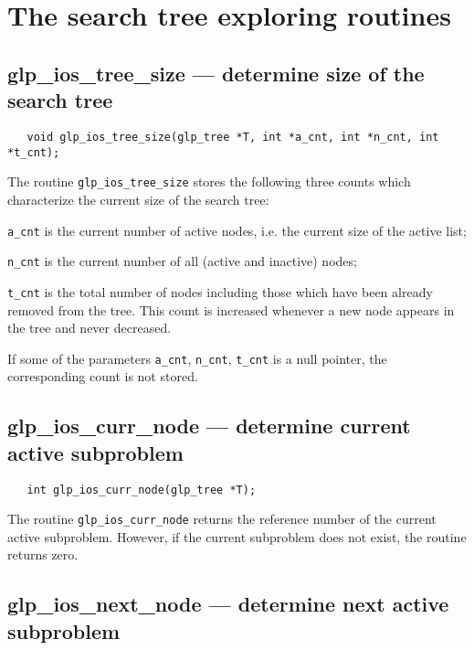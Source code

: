 \section{The search tree exploring routines}

\subsection{glp\_ios\_tree\_size --- determine size of the search tree}

\synopsis

\begin{verbatim}
   void glp_ios_tree_size(glp_tree *T, int *a_cnt, int *n_cnt, int *t_cnt);
\end{verbatim}

\description

The routine \verb|glp_ios_tree_size| stores the following three counts
which characterize the current size of the search tree:

\verb|a_cnt| is the current number of active nodes, i.e. the current
size of the active list;

\verb|n_cnt| is the current number of all (active and inactive) nodes;

\verb|t_cnt| is the total number of nodes including those which have
been already removed from the tree. This count is increased whenever
a new node appears in the tree and never decreased.

If some of the parameters \verb|a_cnt|, \verb|n_cnt|, \verb|t_cnt| is
a null pointer, the corresponding count is not stored.

\subsection{glp\_ios\_curr\_node --- determine current active
subproblem}

\synopsis

\begin{verbatim}
   int glp_ios_curr_node(glp_tree *T);
\end{verbatim}

\returns

The routine \verb|glp_ios_curr_node| returns the reference number of
the current active subproblem. However, if the current subproblem does
not exist, the routine returns zero.

\subsection{glp\_ios\_next\_node --- determine next active subproblem}

